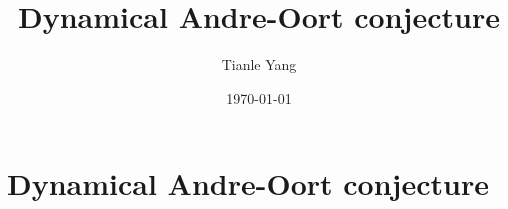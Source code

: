 \documentclass[sectionlevel=section,status=draft]{noteformyself}
\title{Dynamical Andre-Oort conjecture}
\author{Tianle Yang}
\date{\today}
\begin{document}
\maketitle

    \section[
      status=draft,
      tag=00000,
      label=\labelNFM{sec:endomorphisms-on-projective-spaces:dynamical-andre-oort-conjecture}
    ]{Dynamical Andre-Oort conjecture}



\end{document}
